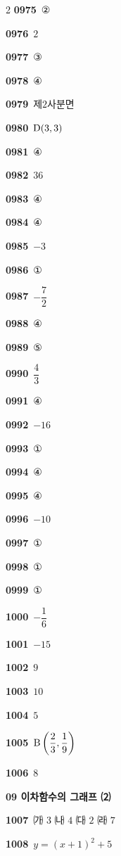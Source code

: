 \documentclass[10pt,a4paper]{article}
\newcommand{\pt}[1]{\mathrm{#1}}
\begin{document}
\begin{multicols}{2}
\noindent\textbf{0975}\ ②\par
\noindent\textbf{0976}\ $2$\par
\noindent\textbf{0977}\ ③\par
\noindent\textbf{0978}\ ④\par
\noindent\textbf{0979}\ 제$2$사분면\par
\noindent\textbf{0980}\ $\pt{D}(3{,}\mkern3mu 3)$\par
\noindent\textbf{0981}\ ④\par
\noindent\textbf{0982}\ $36$\par
\noindent\textbf{0983}\ ④\par
\noindent\textbf{0984}\ ④\par
\noindent\textbf{0985}\ $-3$\par
\noindent\textbf{0986}\ ①\par
\noindent\textbf{0987}\ $-\dfrac{7}{2}$\par
\noindent\textbf{0988}\ ④\par
\noindent\textbf{0989}\ ⑤\par
\noindent\textbf{0990}\ $\dfrac{4}{3}$\par
\noindent\textbf{0991}\ ④\par
\noindent\textbf{0992}\ $-16$\par
\noindent\textbf{0993}\ ①\par
\noindent\textbf{0994}\ ④\par
\noindent\textbf{0995}\ ④\par
\noindent\textbf{0996}\ $-10$\par
\noindent\textbf{0997}\ ①\par
\noindent\textbf{0998}\ ①\par
\noindent\textbf{0999}\ ①\par
\noindent\textbf{1000}\ $-\dfrac{1}{6}$\par
\noindent\textbf{1001}\ $-15$\par
\noindent\textbf{1002}\ $9$\par
\noindent\textbf{1003}\ $10$\par
\noindent\textbf{1004}\ $5$\par
\noindent\textbf{1005}\ $\pt{B}\left(\dfrac{2}{3}{,}\mkern3mu \dfrac{1}{9}\right)$\par
\noindent\textbf{1006}\ $8$\par
\noindent\textbf{09 이차함수의 그래프 ⑵}\par\smallskip
\noindent\textbf{1007}\ ㈎ $3$ ㈏ $4$ ㈐ $2$ ㈑ $7$\par
\noindent\textbf{1008}\ $y=(x+1)^2+5$\par

\end{multicols}
\end{document}
